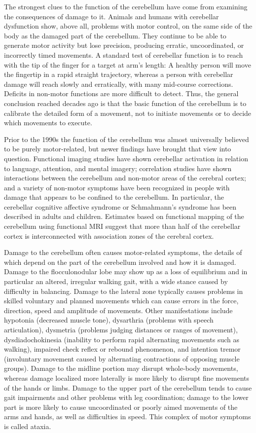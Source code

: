 \documentclass[]{book}
\begin{document}
The strongest clues to the function of the cerebellum have come from examining the consequences of damage to it. Animals and humans with cerebellar dysfunction show, above all, problems with motor control, on the same side of the body as the damaged part of the cerebellum. They continue to be able to generate motor activity but lose precision, producing erratic, uncoordinated, or incorrectly timed movements. A standard test of cerebellar function is to reach with the tip of the finger for a target at arm's length: A healthy person will move the fingertip in a rapid straight trajectory, whereas a person with cerebellar damage will reach slowly and erratically, with many mid-course corrections. Deficits in non-motor functions are more difficult to detect. Thus, the general conclusion reached decades ago is that the basic function of the cerebellum is to calibrate the detailed form of a movement, not to initiate movements or to decide which movements to execute.

Prior to the 1990s the function of the cerebellum was almost universally believed to be purely motor-related, but newer findings have brought that view into question. Functional imaging studies have shown cerebellar activation in relation to language, attention, and mental imagery; correlation studies have shown interactions between the cerebellum and non-motor areas of the cerebral cortex; and a variety of non-motor symptoms have been recognized in people with damage that appears to be confined to the cerebellum. In particular, the cerebellar cognitive affective syndrome or Schmahmann's syndrome has been described in adults and children. Estimates based on functional mapping of the cerebellum using functional MRI suggest that more than half of the cerebellar cortex is interconnected with association zones of the cerebral cortex.

Damage to the cerebellum often causes motor-related symptoms, the details of which depend on the part of the cerebellum involved and how it is damaged. Damage to the flocculonodular lobe may show up as a loss of equilibrium and in particular an altered, irregular walking gait, with a wide stance caused by difficulty in balancing. Damage to the lateral zone typically causes problems in skilled voluntary and planned movements which can cause errors in the force, direction, speed and amplitude of movements. Other manifestations include hypotonia (decreased muscle tone), dysarthria (problems with speech articulation), dysmetria (problems judging distances or ranges of movement), dysdiadochokinesia (inability to perform rapid alternating movements such as walking), impaired check reflex or rebound phenomenon, and intention tremor (involuntary movement caused by alternating contractions of opposing muscle groups). Damage to the midline portion may disrupt whole-body movements, whereas damage localized more laterally is more likely to disrupt fine movements of the hands or limbs. Damage to the upper part of the cerebellum tends to cause gait impairments and other problems with leg coordination; damage to the lower part is more likely to cause uncoordinated or poorly aimed movements of the arms and hands, as well as difficulties in speed. This complex of motor symptoms is called ataxia.
\end{document}
